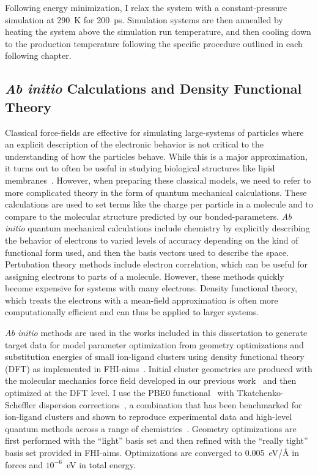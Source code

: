 Following energy minimization, I relax the system with a constant-pressure
simulation at 290~K for 200~ps. Simulation systems are then annealled by heating the system above the
simulation run temperature, and then cooling down to the production temperature following the
specific procedure outlined in each following chapter.

\subsection{\emph{Ab initio} Calculations and Density Functional Theory}
Classical force-fields are effective for simulating large-systems of particles where an explicit description of 
the electronic behavior is not critical to the understanding of how the particles behave. While this is a major 
approximation, it turns out to often be useful in studying biological structures like lipid membranes~\cite{berkowitz:2019}.
However, when preparing these classical models, we need to refer to more complicated theory in the form 
of quantum mechanical calculations. These calculations are used to set terms like the 
charge per particle in a molecule and to compare to the molecular structure predicted by our bonded-parameters.
\emph{Ab initio} quantum mechanical calculations include chemistry by explicitly describing the behavior of electrons to varied 
levels of accuracy depending on the kind of functional form used, and then the basis vectors used to describe the space.
Pertubation theory methods include electron correlation, which can be useful for assigning electrons to parts of a molecule. 
However, these methods quickly become expensive for systems with many electrons. Density functional theory, which treats the electrons 
with a mean-field approximation is often more computationally efficient and can thus be applied to larger systems.

\emph{Ab initio} methods are used in the works included in this dissertation to generate target data for 
model parameter optimization from geometry
optimizations and substitution energies of small ion-ligand clusters
using density functional theory (DFT) as implemented in
FHI-aims~\cite{fhiaims}. Initial cluster geometries are produced with
the molecular mechanics force field developed in our previous
work~\cite{kruczek:2017,saunders:2019} and then optimized at the DFT
level. I use the PBE0 functional~\cite{perdew:1996:generalized,adamo:1999:toward}
with Tkatchenko-Scheffler dispersion corrections~\cite{tkatchenko:2009},
a combination that has been benchmarked for ion-ligand clusters and shown
to reproduce experimental data and high-level quantum methods across a
range of chemistries~\cite{wineman:2019,wineman:2020:transferable,wineman:2020:improved}.
Geometry optimizations are first performed with the ``light'' basis set
and then refined with the ``really tight'' basis set provided in
FHI-aims. Optimizations are converged to 0.005~eV/\AA{} in forces and
$10^{-6}$~eV in total energy.  

